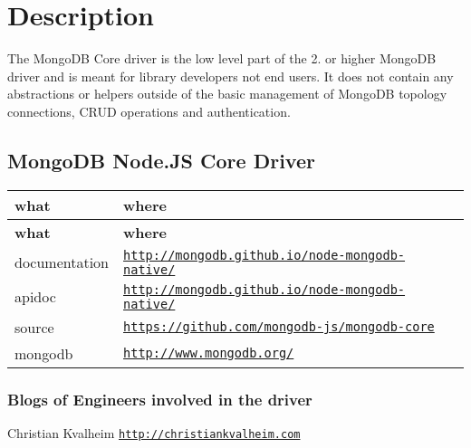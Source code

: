 \href{http://travis-ci.org/mongodb-js/mongodb-core}{\tt } \href{https://coveralls.io/github/mongodb-js/mongodb-core?branch=1.3}{\tt }

\section*{Description}

The Mongo\+DB Core driver is the low level part of the 2. or higher Mongo\+DB driver and is meant for library developers not end users. It does not contain any abstractions or helpers outside of the basic management of Mongo\+DB topology connections, C\+R\+UD operations and authentication.

\subsection*{Mongo\+DB Node.\+JS Core Driver}

\tabulinesep=1mm
\begin{longtabu} spread 0pt [c]{*{2}{|X[-1]}|}
\hline
\rowcolor{\tableheadbgcolor}\textbf{ what  }&\textbf{ where   }\\
\endfirsthead
\hline
\endfoot
\hline
\rowcolor{\tableheadbgcolor}\textbf{ what  }&\textbf{ where   }\\
\endhead
documentation  &\href{http://mongodb.github.io/node-mongodb-native/}{\tt http\+://mongodb.\+github.\+io/node-\/mongodb-\/native/}   \\
apidoc  &\href{http://mongodb.github.io/node-mongodb-native/}{\tt http\+://mongodb.\+github.\+io/node-\/mongodb-\/native/}   \\
source  &\href{https://github.com/mongodb-js/mongodb-core}{\tt https\+://github.\+com/mongodb-\/js/mongodb-\/core}   \\
mongodb  &\href{http://www.mongodb.org/}{\tt http\+://www.\+mongodb.\+org/}   \\
\end{longtabu}


\subsubsection*{Blogs of Engineers involved in the driver}


\begin{DoxyItemize}
\item Christian Kvalheim \href{https://twitter.com/christkv}{\tt } \href{http://christiankvalheim.com}{\tt http\+://christiankvalheim.\+com}
\end{DoxyItemize}

